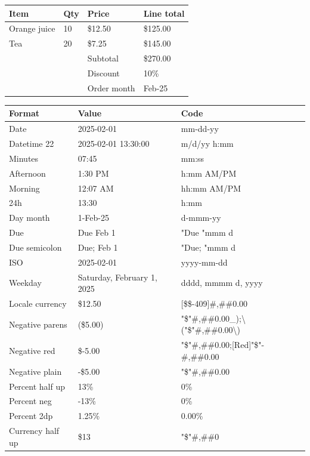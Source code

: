 \documentclass[11pt,a4paper]{article}
\begin{document}
\begin{table}[h]
\begin{tabular}{|l|l|l|l|}
\hline
Item & Qty & Price & Line total \\ \hline
Orange juice & 10 & \$12.50 & \$125.00 \\ \hline
Tea & 20 & \$7.25 & \$145.00 \\ \hline
 &  & Subtotal & \$270.00 \\ \hline
 &  & Discount & 10\% \\ \hline
 &  & Order month & Feb-25 \\ \hline
\end{tabular}
\end{table}

\begin{table}[h]
\begin{tabular}{|l|l|l|}
\hline
Format & Value & Code \\ \hline
Date & 2025-02-01 & mm-dd-yy \\ \hline
Datetime 22 & 2025-02-01 13:30:00 & m/d/yy h:mm \\ \hline
Minutes & 07:45 & mm:ss \\ \hline
Afternoon & 1:30 PM & h:mm AM/PM \\ \hline
Morning & 12:07 AM & hh:mm AM/PM \\ \hline
24h & 13:30 & h:mm \\ \hline
Day month & 1-Feb-25 & d-mmm-yy \\ \hline
Due & Due Feb 1 & "Due "mmm d \\ \hline
Due semicolon & Due; Feb 1 & "Due; "mmm d \\ \hline
ISO & 2025-02-01 & yyyy-mm-dd \\ \hline
Weekday & Saturday, February 1, 2025 & dddd, mmmm d, yyyy \\ \hline
Locale currency & \$12.50 & [\$\$-409]\#,\#\#0.00 \\ \hline
Negative parens & (\$5.00) & "\$"\#,\#\#0.00\_);\textbackslash{}("\$"\#,\#\#0.00\textbackslash{}) \\ \hline
Negative red & \$-5.00 & "\$"\#,\#\#0.00;[Red]"\$"-\#,\#\#0.00 \\ \hline
Negative plain & -\$5.00 & "\$"\#,\#\#0.00 \\ \hline
Percent half up & 13\% & 0\% \\ \hline
Percent neg & -13\% & 0\% \\ \hline
Percent 2dp & 1.25\% & 0.00\% \\ \hline
Currency half up & \$13 & "\$"\#,\#\#0 \\ \hline

\end{tabular}
\end{table}
\end{document}
